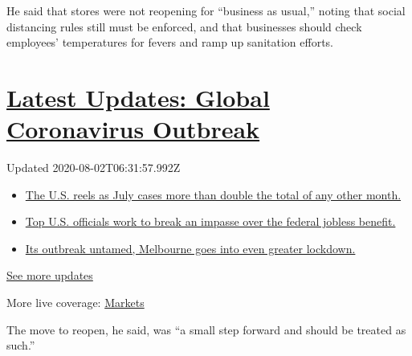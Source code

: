 He said that stores were not reopening for ``business as usual,'' noting
that social distancing rules still must be enforced, and that businesses
should check employees' temperatures for fevers and ramp up sanitation
efforts.

\hypertarget{latest-updates-global-coronavirus-outbreak}{%
\section{\texorpdfstring{\href{https://www.nytimes.com/2020/08/01/world/coronavirus-covid-19.html?action=click\&pgtype=Article\&state=default\&region=MAIN_CONTENT_1\&context=storylines_live_updates}{Latest
Updates: Global Coronavirus
Outbreak}}{Latest Updates: Global Coronavirus Outbreak}}\label{latest-updates-global-coronavirus-outbreak}}

Updated 2020-08-02T06:31:57.992Z

\begin{itemize}
\tightlist
\item
  \href{https://www.nytimes.com/2020/08/01/world/coronavirus-covid-19.html?action=click\&pgtype=Article\&state=default\&region=MAIN_CONTENT_1\&context=storylines_live_updates\#link-34047410}{The
  U.S. reels as July cases more than double the total of any other
  month.}
\item
  \href{https://www.nytimes.com/2020/08/01/world/coronavirus-covid-19.html?action=click\&pgtype=Article\&state=default\&region=MAIN_CONTENT_1\&context=storylines_live_updates\#link-780ec966}{Top
  U.S. officials work to break an impasse over the federal jobless
  benefit.}
\item
  \href{https://www.nytimes.com/2020/08/01/world/coronavirus-covid-19.html?action=click\&pgtype=Article\&state=default\&region=MAIN_CONTENT_1\&context=storylines_live_updates\#link-2bc8948}{Its
  outbreak untamed, Melbourne goes into even greater lockdown.}
\end{itemize}

\href{https://www.nytimes.com/2020/08/01/world/coronavirus-covid-19.html?action=click\&pgtype=Article\&state=default\&region=MAIN_CONTENT_1\&context=storylines_live_updates}{See
more updates}

More live coverage:
\href{https://www.nytimes.com/live/2020/07/31/business/stock-market-today-coronavirus?action=click\&pgtype=Article\&state=default\&region=MAIN_CONTENT_1\&context=storylines_live_updates}{Markets}

The move to reopen, he said, was ``a small step forward and should be
treated as such.''

